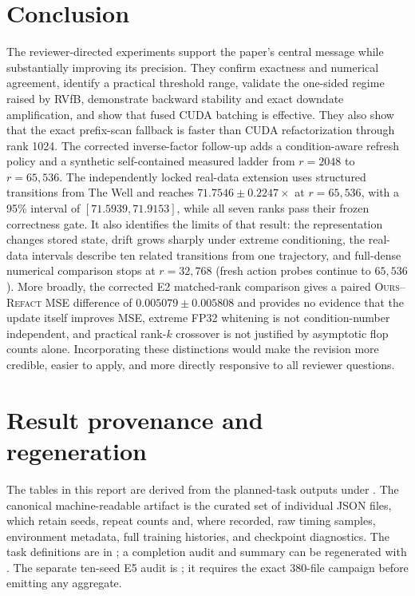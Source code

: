 \documentclass[11pt]{article}
\newcommand{\ours}{\textsc{Ours}}
\newcommand{\refact}{\textsc{Refact}}
\begin{document}
\section{Conclusion}

The reviewer-directed experiments support the paper's central message while
substantially improving its precision.  They confirm exactness and numerical
agreement, identify a practical threshold range, validate the one-sided
regime raised by RVfB, demonstrate backward stability and exact downdate
amplification, and show that fused CUDA batching is effective.  They also
show that the exact prefix-scan fallback is faster than CUDA refactorization
through rank 1024.  The corrected inverse-factor follow-up adds a
condition-aware refresh policy and a synthetic self-contained measured ladder
from \(r=2048\) to \(r=65{,}536\).  The independently locked real-data
extension uses structured transitions from The Well and reaches
\(71.7546\pm0.2247\times\) at \(r=65{,}536\), with a 95\% interval of
\([71.5939,71.9153]\), while all seven ranks pass their frozen correctness
gate.  It also identifies the limits of that result: the representation
changes stored state, drift grows sharply under extreme conditioning, the
real-data intervals describe ten related transitions from one trajectory,
and full-dense numerical comparison stops at \(r=32{,}768\) (fresh action
probes continue to \(65{,}536\)).  More broadly,
the corrected E2 matched-rank comparison gives a paired
\ours{}--\refact{} MSE difference of \(0.005079\pm0.005808\) and provides no
evidence that the update itself improves MSE,
extreme FP32 whitening is not condition-number independent, and practical
rank-\(k\) crossover is not justified by asymptotic flop counts alone.
Incorporating these distinctions would make the revision more credible,
easier to apply, and more directly responsive to all reviewer questions.

\appendix

\section{Result provenance and regeneration}

The tables in this report are derived from the planned-task outputs under
.  The canonical machine-readable artifact is the
curated set of individual JSON files, which retain seeds, repeat counts and,
where recorded, raw timing samples, environment metadata, full training
histories, and checkpoint diagnostics.  The task definitions are in
; a completion audit and summary can
be regenerated with .  The separate
ten-seed E5 audit is ; it
requires the exact 380-file campaign before emitting any aggregate.
\end{document}
